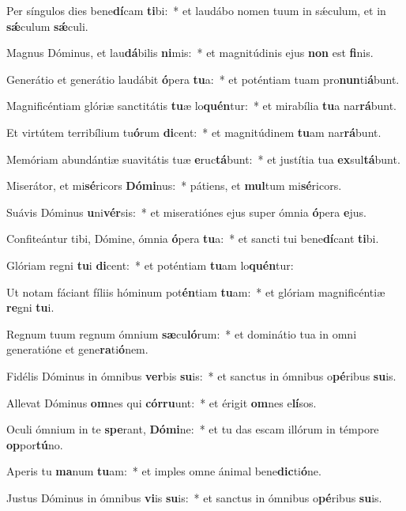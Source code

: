 \item Per síngulos dies bene\textbf{dí}cam \textbf{ti}bi:~* et laudábo nomen tuum in sǽculum, et in \textbf{sǽ}culum \textbf{sǽ}culi.
\item Magnus Dóminus, et lau\textbf{dá}bilis \textbf{ni}mis:~* et magnitúdinis ejus \textbf{non} est \textbf{fi}nis.
\item Generátio et generátio laudábit \textbf{ó}pera \textbf{tu}a:~* et poténtiam tuam pro\textbf{nun}ti\textbf{á}bunt.
\item Magnificéntiam glóriæ sanctitátis \textbf{tu}æ lo\textbf{quén}tur:~* et mirabília \textbf{tu}a nar\textbf{rá}bunt.
\item Et virtútem terribílium tu\textbf{ó}rum \textbf{di}cent:~* et magnitúdinem \textbf{tu}am nar\textbf{rá}bunt.
\item Memóriam abundántiæ suavitátis tuæ \textbf{e}ruc\textbf{tá}bunt:~* et justítia tua \textbf{ex}sul\textbf{tá}bunt.
\item Miserátor, et mi\textbf{sé}ricors \textbf{Dó}\textbf{mi}nus:~* pátiens, et \textbf{mul}tum mi\textbf{sé}ricors.
\item Suávis Dóminus \textbf{u}ni\textbf{vér}sis:~* et miseratiónes ejus super ómnia \textbf{ó}pera \textbf{e}jus.
\item Confiteántur tibi, Dómine, ómnia \textbf{ó}pera \textbf{tu}a:~* et sancti tui bene\textbf{dí}cant \textbf{ti}bi.
\item Glóriam regni \textbf{tu}i \textbf{di}cent:~* et poténtiam \textbf{tu}am lo\textbf{quén}tur:
\item Ut notam fáciant fíliis hóminum pot\textbf{én}tiam \textbf{tu}am:~* et glóriam magnificéntiæ \textbf{re}gni \textbf{tu}i.
\item Regnum tuum regnum ómnium \textbf{sæ}cu\textbf{ló}rum:~* et dominátio tua in omni generatióne et gene\textbf{ra}ti\textbf{ó}nem.
\item Fidélis Dóminus in ómnibus \textbf{ver}bis \textbf{su}is:~* et sanctus in ómnibus o\textbf{pé}ribus \textbf{su}is.
\item Allevat Dóminus \textbf{om}nes qui \textbf{cór}\textbf{ru}unt:~* et érigit \textbf{om}nes e\textbf{lí}sos.
\item Oculi ómnium in te \textbf{spe}rant, \textbf{Dó}\textbf{mi}ne:~* et tu das escam illórum in témpore \textbf{op}por\textbf{tú}no.
\item Aperis tu \textbf{ma}num \textbf{tu}am:~* et imples omne ánimal bene\textbf{dic}ti\textbf{ó}ne.
\item Justus Dóminus in ómnibus \textbf{vi}is \textbf{su}is:~* et sanctus in ómnibus o\textbf{pé}ribus \textbf{su}is.
